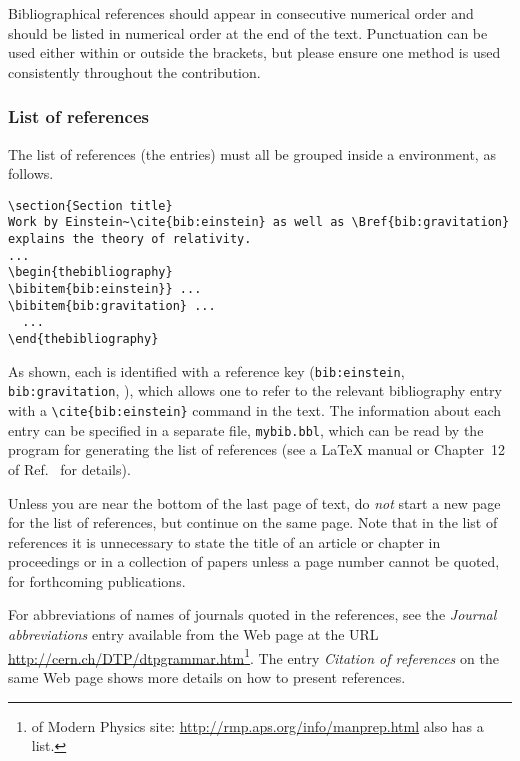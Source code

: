 \documentclass[12pt,twoside,a4paper]{cernrep}
\begin{document}
Bibliographical references should appear in consecutive numerical
order and should be listed in numerical order at the end of the
text. Punctuation can be used either within or outside the brackets,
but please ensure one method is used consistently throughout the
contribution.

\subsubsection{List of references}

The list of references (the  entries) must all be grouped
inside a  environment, as follows.

\begin{verbatim}
\section{Section title}
Work by Einstein~\cite{bib:einstein} as well as \Bref{bib:gravitation}
explains the theory of relativity.
...
\begin{thebibliography}
\bibitem{bib:einstein}} ...
\bibitem{bib:gravitation} ...
  ...
\end{thebibliography}
\end{verbatim}
As shown, each  is identified with a reference key
(\texttt{bib:einstein}, \texttt{bib:gravitation}, \etc), which allows
one to refer to the relevant bibliography entry with a
\verb|\cite{bib:einstein}| command in the text. The information about
each entry can be specified in a separate file, \eg
\texttt{mybib.bbl}, which can be read by the \BibTeX{} program for
generating the list of references (see a \LaTeX{} manual or Chapter~12
of Ref.~\cite{bib:mittelbach2004} for details).

Unless you are near the bottom of the last page of text, do \emph{not}
start a new page for the list of references, but continue on the same
page. Note that in the list of references it is unnecessary to state
the title of an article or chapter in proceedings or in a collection
of papers unless a page number cannot be quoted, \eg for forthcoming
publications.

For abbreviations of names of journals quoted in the references, see
the \emph{Journal abbreviations} entry available from the Web page at
the URL \url{http://cern.ch/DTP/dtpgrammar.htm}\footnote{%
of Modern Physics site: \url{http://rmp.aps.org/info/manprep.html}
also has a list.}. The entry \emph{Citation of references} on the same
Web page shows more details on how to present references.
\end{document}
